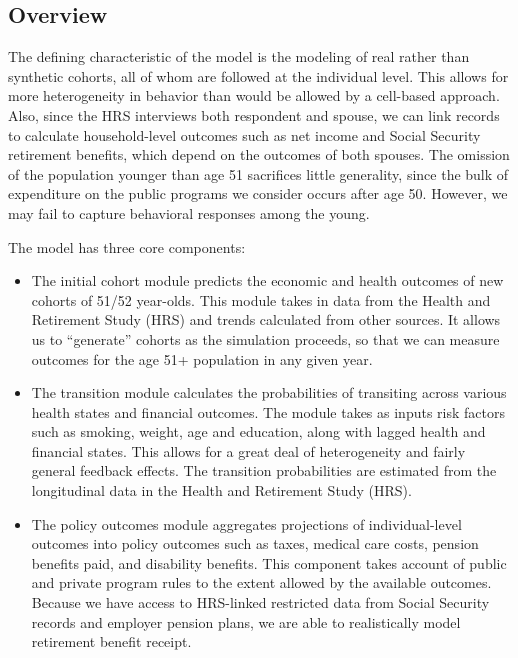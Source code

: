 \subsection{Overview}

The defining characteristic of the model is the modeling of real rather than synthetic cohorts, all of whom are followed at the individual level. This allows for more heterogeneity in behavior than would be allowed by a cell-based approach. Also, since the HRS interviews both respondent and spouse, we can link records to calculate household-level outcomes such as net income and Social Security retirement benefits, which depend on the outcomes of both spouses. The omission of the population younger than age 51 sacrifices little generality, since the bulk of expenditure on the public programs we consider occurs after age 50. However, we may fail to capture behavioral responses among the young. 

The model has three core components: 
\begin{itemize}
\item The initial cohort module predicts the economic and health outcomes of new cohorts of 51/52 
year-olds. This module takes in data from the Health and Retirement Study (HRS) and trends calculated 
from other sources. It allows us to ``generate'' cohorts as the simulation proceeds, so that we can 
measure outcomes for the age 51+ population in any given year. 
\item The transition module calculates the probabilities of transiting across various health states 
and financial outcomes. The module takes as inputs risk factors such as smoking, weight, age and 
education, along with lagged health and financial states. This allows for a great deal of 
heterogeneity and fairly general feedback effects. The transition probabilities are estimated from 
the longitudinal data in the Health and Retirement Study (HRS). 
\item The policy outcomes module aggregates projections of individual-level outcomes into policy 
outcomes such as taxes, medical care costs, pension benefits paid, and disability benefits. This 
component takes account of public and private program rules to the extent allowed by the available 
outcomes. Because we have access to HRS-linked restricted data from Social Security records and 
employer pension plans, we are able to realistically model retirement benefit receipt. 
\end{itemize}

